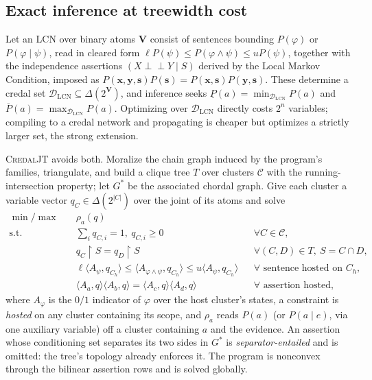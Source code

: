 \documentclass[11pt]{article}
\theoremstyle{definition}
\newcommand{\lo}{\underline}
\newcommand{\hi}{\overline}
\newcommand{\indep}{\perp\!\!\!\perp}
\newcommand{\DLCN}{\mathcal{D}_{\mathrm{LCN}}}
\newcommand{\restr}{\!\restriction\!}
\newcommand{\readoff}{\rho}
\begin{document}
\subsection*{Exact inference at treewidth cost}

Let an LCN over binary atoms $\mathbf V$ consist of sentences bounding
$P(\varphi)$ or $P(\varphi\mid\psi)$, read in cleared form
$\ell P(\psi)\le P(\varphi\wedge\psi)\le uP(\psi)$, together with the
independence assertions $(X\indep Y\mid S)$ derived by the Local Markov
Condition, imposed as $P(\mathbf x,\mathbf y,\mathbf s)P(\mathbf s)
=P(\mathbf x,\mathbf s)P(\mathbf y,\mathbf s)$. These determine a credal set
$\DLCN\subseteq\Delta(2^{\mathbf V})$, and inference seeks
$\lo P(a)=\min_{\DLCN}P(a)$ and $\hi P(a)=\max_{\DLCN}P(a)$. Optimizing over
$\DLCN$ directly costs $2^n$ variables; compiling to a credal network and
propagating is cheaper but optimizes a strictly larger set, the strong extension.

\textsc{CredalJT} avoids both. Moralize the chain graph induced by the program's
families, triangulate, and build a clique tree $T$ over clusters $\mathcal C$
with the running-intersection property; let $G^\ast$ be the associated chordal
graph. Give each cluster a variable vector $q_C\in\Delta(2^{|C|})$ over the joint
of its atoms and solve
\[
\begin{aligned}
\min/\max\quad & \readoff_a(q)\\
\text{s.t.}\quad
&\textstyle\sum_i q_{C,i}=1,\ q_{C,i}\ge0 && \forall C\in\mathcal C,\\
&q_C\restr S=q_D\restr S && \forall (C,D)\in T,\ S=C\cap D,\\
&\ell\langle A_{\psi},q_{C_h}\rangle\le\langle A_{\varphi\wedge\psi},q_{C_h}\rangle
   \le u\langle A_{\psi},q_{C_h}\rangle && \forall\text{ sentence hosted on }C_h,\\
&\langle A_a,q\rangle\langle A_b,q\rangle=\langle A_c,q\rangle\langle A_d,q\rangle
   && \forall\text{ assertion hosted,}
\end{aligned}
\]
where $A_\varphi$ is the $0/1$ indicator of $\varphi$ over the host cluster's
states, a constraint is \emph{hosted} on any cluster containing its scope, and
$\readoff_a$ reads $P(a)$ (or $P(a\mid e)$, via one auxiliary variable) off a
cluster containing $a$ and the evidence. An assertion whose conditioning set
separates its two sides in $G^\ast$ is \emph{separator-entailed} and is omitted:
the tree's topology already enforces it. The program is nonconvex through the
bilinear assertion rows and is solved globally.
\end{document}
